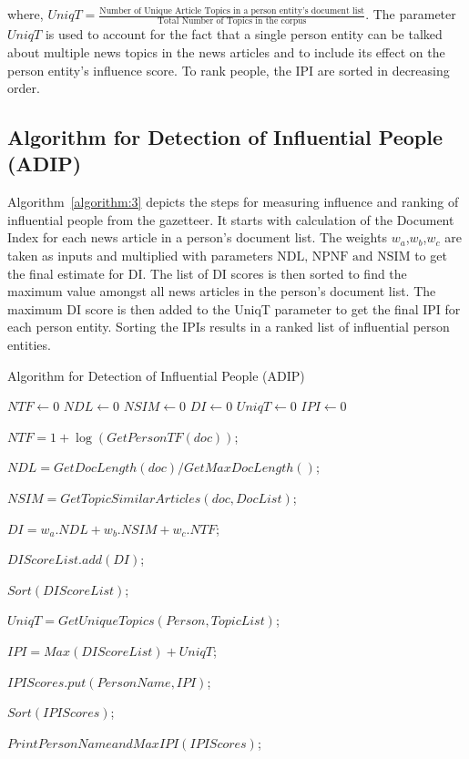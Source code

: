 where, $UniqT = \frac{\text{Number of Unique Article Topics in a person entity's document list}}{\text{Total Number of Topics in the corpus}}$. The parameter $UniqT$  is used to account for the fact that a single person entity can be talked about multiple news topics in the news articles and to include its effect on the person entity's influence score. %
To rank people, the IPI are sorted in decreasing order. %
  
\subsection{Algorithm for Detection of Influential People (ADIP)}

Algorithm~\ref{algorithm:3} depicts the steps for measuring influence and ranking of influential people from the gazetteer. It starts with calculation of the Document Index for each news article in a person's document list. The weights $w_a$,$w_b$,$w_c$ are taken as inputs and multiplied with parameters $\text{NDL, NPNF and NSIM}$  to get the final estimate for DI. The list of DI scores is then sorted to find the maximum value amongst all news articles in the person's document list. The maximum DI score is then added to the UniqT parameter to get the final IPI for each person entity. Sorting the IPIs results in a ranked list of influential person entities.  


\begin{algorithm*}[!th]
\caption{Algorithm for Detection of Influential People (ADIP)}
\label{algorithm:3}
\begin{algorithmic}
  

 $NTF \leftarrow $0
 $NDL \leftarrow $0
 $NSIM \leftarrow $0
 $DI\leftarrow $0
 $UniqT\leftarrow $0
 $IPI\leftarrow $0\;  
  
     {
	{	
		$NTF=1+\log (GetPersonTF(doc))$;
		
$NDL=GetDocLength(doc)/GetMaxDocLength()$;

		$ NSIM=GetTopicSimilarArticles(doc,DocList)$;

		$DI=w_a . NDL+w_b . NSIM+ w_c . NTF$;
		
		$DIScoreList.add(DI)$;
 	 }
		$Sort(DIScoreList)$;

		$UniqT=GetUniqueTopics(Person,TopicList)$;

		$IPI=Max(DIScoreList)+UniqT$;

		$IPIScores.put(PersonName,IPI)$;
       }
	$Sort(IPIScores)$;

	$PrintPersonNameandMaxIPI(IPIScores)$;

\EndFunction
\end{algorithmic}
\end{algorithm*}

